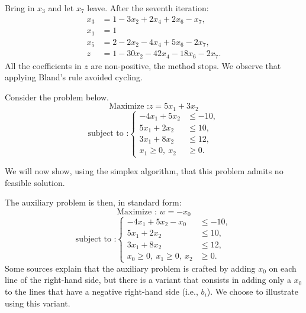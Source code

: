 \begin{example}
    Bring in \(x_3\) and let \(x_7\) leave. After the seventh iteration:
    \[
        \begin{aligned}
        x_3 &= 1 - 3x_2 + 2x_4 + 2x_6 - x_7,\\
        x_1 &= 1 \\
        x_5 &= 2 - 2x_2 - 4x_4 + 5x_6 - 2x_7,\\
        \hline
        z &= 1 - 30x_2 - 42x_4 - 18x_6 - 2x_7.
        \end{aligned}
    \]
    All the coefficients in \(z\) are non-positive, the method stops. We observe that applying Bland’s rule avoided cycling.
\end{example}

\begin{example}\label{ex:add-xzero-to-neg-only}
    \item Consider the problem below.
    \[
        \text{Maximize :} z = 5x_1 + 3x_2
    \]
    \[
        \text{subject to :}
        \left\{
        \begin{aligned}
        -4x_1 + 5x_2 &\leqslant -10,\\
        5x_1 + 2x_2 &\leqslant 10,\\
        3x_1 + 8x_2 &\leqslant 12,\\
        x_1 \ge 0,\ x_2 &\ge 0.
        \end{aligned}
        \right.
    \]

    We will now show, using the simplex algorithm, that this problem admits no feasible solution.

    The auxiliary problem is then, in standard form:
    \[
        \text{Maximize : } w = -x_0
    \]
    \[
        \text{subject to :}
        \left\{
        \begin{aligned}
            -4x_1 + 5x_2 - x_0 &\leqslant -10,\\
            5x_1 + 2x_2 &\leqslant 10,\\
            3x_1 + 8x_2 &\leqslant 12,\\
            x_0 \ge 0,\ x_1 \ge 0,\ x_2 &\ge 0.
        \end{aligned}
        \right.
    \]
    Some sources explain that the auxiliary problem is crafted by adding $x_0$ on each line of the right-hand side, but there is a variant that consists in adding only a $x_0$ to the lines that have a negative right-hand side (i.e., $b_i$). We choose to illustrate using this variant. 
    

\end{example}
